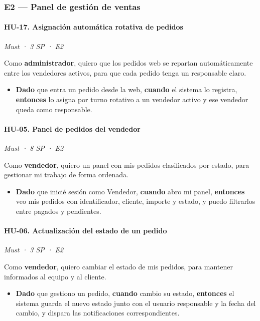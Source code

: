 \documentclass[12pt, a4paper]{article}
\newcommand{\hutag}[3]{\textit{#1 · #2 · #3}\par\vspace{2pt}}
\begin{document}
\subsubsection{E2 --- Panel de gestión de ventas}

\paragraph{HU-17. Asignación automática rotativa de pedidos}
\hutag{Must}{3 SP}{E2}
Como \textbf{administrador}, quiero que los pedidos web se repartan automáticamente entre los vendedores activos, para que cada pedido tenga un responsable claro.
\begin{itemize}[leftmargin=*]
    \item \textbf{Dado} que entra un pedido desde la web, \textbf{cuando} el sistema lo registra, \textbf{entonces} lo asigna por turno rotativo a un vendedor activo y ese vendedor queda como responsable.
\end{itemize}

\paragraph{HU-05. Panel de pedidos del vendedor}
\hutag{Must}{8 SP}{E2}
Como \textbf{vendedor}, quiero un panel con mis pedidos clasificados por estado, para gestionar mi trabajo de forma ordenada.
\begin{itemize}[leftmargin=*]
    \item \textbf{Dado} que inicié sesión como Vendedor, \textbf{cuando} abro mi panel, \textbf{entonces} veo mis pedidos con identificador, cliente, importe y estado, y puedo filtrarlos entre pagados y pendientes.
\end{itemize}

\paragraph{HU-06. Actualización del estado de un pedido}
\hutag{Must}{3 SP}{E2}
Como \textbf{vendedor}, quiero cambiar el estado de mis pedidos, para mantener informados al equipo y al cliente.
\begin{itemize}[leftmargin=*]
    \item \textbf{Dado} que gestiono un pedido, \textbf{cuando} cambio su estado, \textbf{entonces} el sistema guarda el nuevo estado junto con el usuario responsable y la fecha del cambio, y dispara las notificaciones correspondientes.
\end{itemize}
\end{document}
